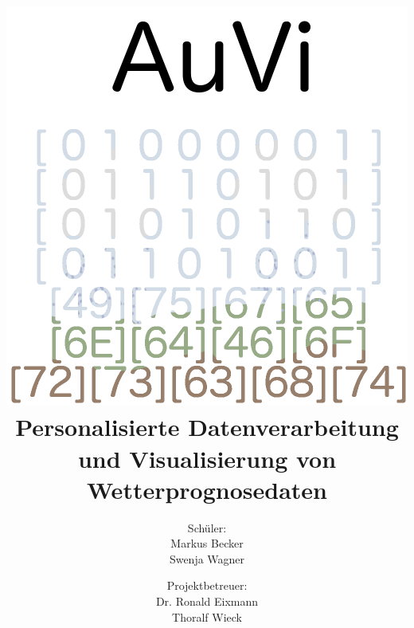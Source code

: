 \documentclass[a4paper,oneside,12pt,titlepage]{article}
\newcommand{\mb}{Markus Becker}
\newcommand{\sw}{Swenja Wagner}
\newcommand{\re}{Dr. Ronald Eixmann}
\newcommand{\tw}{Thoralf Wieck}
\newcommand{\thema}{Personalisierte Datenverarbeitung\\und Visualisierung von Wetterprognosedaten}
\begin{document}
\pagestyle{empty}
\title{\includegraphics[scale=.34]{imgs/auvi_white.png}\\\thema}
\author{Schüler:\\\mb\\\sw \and Projektbetreuer:\\\re\\\tw}
\maketitle

\pagestyle{empty}
\tableofcontents
\thispagestyle{empty}
\pagestyle{plain}
\newpage
\end{document}
